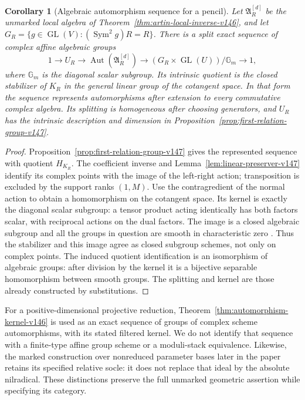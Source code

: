 \documentclass[11pt,reqno]{amsart}
\numberwithin{equation}{section}
\newtheorem{corollary}[theorem]{Corollary}
\theoremstyle{definition}\newtheorem{definition}[theorem]{Definition}
\theoremstyle{remark}\newtheorem{remark}[theorem]{Remark}
\DeclareMathOperator{\Sym}{Sym}\DeclareMathOperator{\Gr}{Gr}
\begin{document}
\begin{corollary}[Algebraic automorphism sequence for a pencil]
\label{cor:pencil-group-scheme-v147}
Let \(\mathfrak A_R^{[d]}\) be the unmarked local algebra of
Theorem~\ref{thm:artin-local-inverse-v146}, and let
\(G_R=\{g\in\operatorname{GL}(V):(\Sym^2g)R=R\}\).
There is a split exact sequence of complex affine algebraic groups
\begin{equation}\label{eq:pencil-algebraic-group-v147}
 1\longrightarrow U_R\longrightarrow
 \operatorname{Aut}(\mathfrak A_R^{[d]})
 \longrightarrow (G_R\times\operatorname{GL}(U))/\mathbb G_m
 \longrightarrow1,
\end{equation}
where \(\mathbb G_m\) is the diagonal scalar subgroup.  Its
intrinsic quotient is the closed stabilizer of \(K_R\) in the
general linear group of the cotangent space.  In that form the
sequence represents automorphisms after extension to every
commutative complex algebra.  Its splitting is homogeneous after
choosing generators, and \(U_R\) has the intrinsic description and
dimension in Proposition~\ref{prop:first-relation-group-v147}.
\end{corollary}
\begin{proof}
Proposition~\ref{prop:first-relation-group-v147} gives the represented
sequence with quotient \(H_{K_R}\).  The coefficient inverse and
Lemma~\ref{lem:linear-preserver-v147} identify its complex points
with the image of the left-right action; transposition is excluded
by the support ranks \((1,M)\).  Use the contragredient of the
normal action to obtain a homomorphism on the cotangent space.
Its kernel is exactly the diagonal scalar subgroup: a tensor product
acting identically has both factors scalar, with reciprocal actions
on the dual factors.  The image is a closed algebraic subgroup and
all the groups in question are smooth in characteristic zero
\cite[Lemma~39.8.2]{StacksGroups}.  Thus the stabilizer and this
image agree as closed subgroup schemes, not only on complex points.
The induced quotient identification is an isomorphism of algebraic
groups: after division by the kernel it is a bijective separable
homomorphism between smooth groups.  The splitting and kernel are
those already constructed by substitutions.
\end{proof}

For a positive-dimensional projective reduction,
Theorem~\ref{thm:automorphism-kernel-v146} is used as an exact
sequence of groups of complex scheme automorphisms, with its stated
filtered kernel.  We do not identify that sequence with a finite-type
affine group scheme or a moduli-stack equivalence.  Likewise, the
marked construction over nonreduced parameter bases later in the
paper retains its specified relative socle: it does not replace that
ideal by the absolute nilradical.  These distinctions preserve the
full unmarked geometric assertion while specifying its category.
\end{document}
